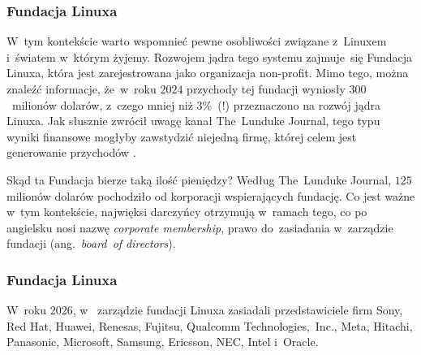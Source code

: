 \documentclass[10pt,t]{beamer}
\begin{document}
\begin{frame}
  \frametitle{Fundacja Linuxa}


  W~tym kontekście warto wspomnieć pewne osobliwości związane z~Linuxem
  i~światem w~którym żyjemy. Rozwojem jądra tego systemu zajmuje~się
  {Fundacja Linuxa}, która jest zarejestrowana jako organizacja non-profit.
  Mimo tego, można znaleźć informacje, że~w~roku $2024$ przychody tej
  fundacji wyniosły $300$~milionów dolarów, z~czego mniej niż $3\%$~(!)
  przeznaczono na rozwój jądra Linuxa. Jak słusznie zwrócił uwagę kanał
  The~Lunduke Journal, tego typu wyniki finansowe mogłyby zawstydzić
  niejedną firmę, której celem jest generowanie przychodów
  \parencite{TLJ-Linux-Foundation-Drops-Linux-Spending-to-Historic-ETC-Ver-2024}.

  Skąd ta Fundacja bierze taką ilość pieniędzy? Według The~Lunduke Journal,
  $125$ milionów dolarów pochodziło od korporacji wspierających fundację.
  Co jest ważne w~tym kontekście, najwięksi darczyńcy otrzymują w~ramach
  tego, co po angielsku nosi nazwę \textit{corporate membership}, prawo
  do~zasiadania w~zarządzie fundacji (ang.~\textit{board~of directors}).

\end{frame}





\begin{frame}
  \frametitle{Fundacja Linuxa}


  W~roku $2026$,
  w~
  {zarządzie fundacji Linuxa} zasiadali przedstawiciele firm Sony, Red
  Hat, Huawei, Renesas, Fujitsu, Qualcomm Technologies,~Inc., Meta,
  Hitachi, Panasonic, Microsoft, Samsung, Ericsson, NEC, Intel i~Oracle.

\end{frame}
\end{document}
